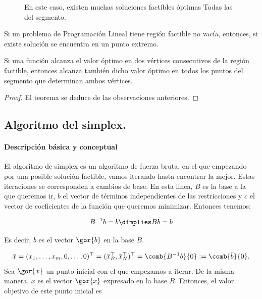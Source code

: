 \begin{figure}[h!]
\centering
{}
\caption{En este caso, existen muchas soluciones factibles óptimas Todas las del segmento.}
\end{figure}



\begin{theorem}
Si un problema de Programación Lineal tiene región factible no vacía, entonces, si existe solución se encuentra en un punto extremo.

Si una función alcanza el valor óptimo en dos vértices consecutivos de la región factible, entonces alcanza también dicho valor óptimo en todos los puntos del segmento que determinan ambos vértices.
\end{theorem}
\begin{proof}
El teorema se deduce de las observaciones anteriores.
\end{proof}


\subsection{Algoritmo del simplex.}

\paragraph{Descripción básica y conceptual}
El algoritmo de simplex es un algoritmo de fuerza bruta, en el que empezando por una posible solución factible, vamos iterando hasta encontrar la mejor. Estas iteraciones se corresponden a cambios de base. En esta linea, $B$ es la base a la que queremos ir, $b$ el vector de términos independientes de las restricciones y $c$ el vector de coeficientes de la función que queremos minimizar. Entonces tenemos:

\[B^{-1}b = \bar{b} \dimplies B\bar{b} = b\]

Es decir, $b$ es el vector $\gor{b}$ en la base $B$.

\[\bar{x}=(x_1,\ldots,x_m,0,\ldots,0)^\top=(\bar{x}_B^\top,\bar{x}_N^\top)^\top=
\comb{B^{-1}b}{0}:=
\comb{\bar{b}}{0}.\]
Sea $\gor{x}$ un punto inicial con el que empezamos a iterar. De la misma manera, $x$ es el vector $\gor{x}$ expresado en la base $B$.
Entonces, el valor objetivo de este punto inicial es

